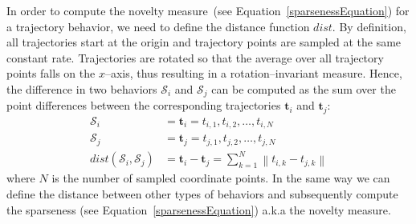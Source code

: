\documentclass{sig-alternate}
\begin{document}

In order to compute the novelty measure~(see Equation~\eqref{sparsenessEquation}) for a trajectory behavior, we need to define the distance function $dist$. By definition, all trajectories start at the origin and trajectory points are sampled at the same constant rate. Trajectories are rotated so that the average over all trajectory points falls on the $x$--axis, thus resulting in a rotation--invariant measure. Hence, the difference in two behaviors $\mathcal{S}_i$ and $\mathcal{S}_j$ can be computed as the sum over the point differences between the corresponding trajectories $\bm{t}_i$ and $\bm{t}_j$: 
\begin{align}
\mathcal{S}_i &= \bm{t}_i = t_{i,1}, t_{i,2}, \ldots, t_{i,N}\\
\mathcal{S}_j &= \bm{t}_j = t_{j,1}, t_{j,2}, \ldots, t_{j,N}\\
dist(\mathcal{S}_i, \mathcal{S}_j) &= \bm{t}_i - \bm{t}_j = \sum_{k=1}^{N} \left\lVert t_{i, k} - t_{j, k} \right\rVert
\end{align}
where $N$ is the number of sampled coordinate points. In the same way we can define the distance between other types of behaviors and subsequently compute the sparseness (see Equation~\eqref{sparsenessEquation}) a.k.a the novelty measure.

\end{document}

